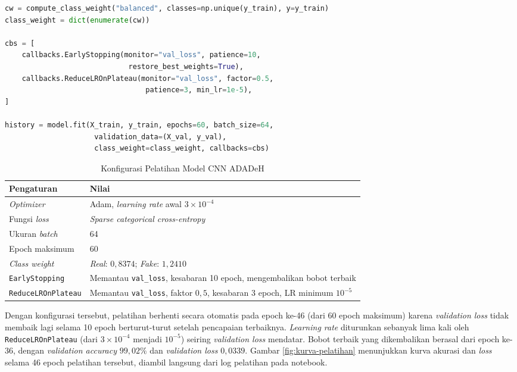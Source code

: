 \begin{lstlisting}[language=Python, caption={Pelatihan model CNN dengan \textit{class weight} dan \textit{callback}}, label={lst:pelatihan}]
cw = compute_class_weight("balanced", classes=np.unique(y_train), y=y_train)
class_weight = dict(enumerate(cw))

cbs = [
    callbacks.EarlyStopping(monitor="val_loss", patience=10,
                             restore_best_weights=True),
    callbacks.ReduceLROnPlateau(monitor="val_loss", factor=0.5,
                                 patience=3, min_lr=1e-5),
]

history = model.fit(X_train, y_train, epochs=60, batch_size=64,
                     validation_data=(X_val, y_val),
                     class_weight=class_weight, callbacks=cbs)
\end{lstlisting}

\begin{table}[htbp]
  \centering
  \caption{Konfigurasi Pelatihan Model CNN ADADeH}
  \label{tab:konfigurasi-pelatihan}
  \begin{tabular}{@{}lp{8.4cm}@{}}
    \toprule
    \textbf{Pengaturan} & \textbf{Nilai} \\
    \midrule
    \textit{Optimizer} & Adam, \textit{learning rate} awal $3\times10^{-4}$ \\
    Fungsi \textit{loss} & \textit{Sparse categorical cross-entropy} \\
    Ukuran \textit{batch} & 64 \\
    Epoch maksimum & 60 \\
    \textit{Class weight} & \textit{Real}: $0{,}8374$; \textit{Fake}: $1{,}2410$ \\
    \texttt{EarlyStopping} & Memantau \texttt{val\_loss}, kesabaran 10 epoch, mengembalikan bobot terbaik \\
    \texttt{ReduceLROnPlateau} & Memantau \texttt{val\_loss}, faktor $0{,}5$, kesabaran 3 epoch, LR minimum $10^{-5}$ \\
    \bottomrule
  \end{tabular}
\end{table}

Dengan konfigurasi tersebut, pelatihan berhenti secara otomatis pada epoch ke-46
(dari 60 epoch maksimum) karena \textit{validation loss} tidak membaik lagi selama
10 epoch berturut-turut setelah pencapaian terbaiknya. \textit{Learning rate}
diturunkan sebanyak lima kali oleh \texttt{ReduceLROnPlateau} (dari $3\times10^{-4}$
menjadi $10^{-5}$) seiring \textit{validation loss} mendatar. Bobot terbaik yang
dikembalikan berasal dari epoch ke-36, dengan \textit{validation accuracy}
$99{,}02\%$ dan \textit{validation loss} $0{,}0339$. Gambar
\ref{fig:kurva-pelatihan} menunjukkan kurva akurasi dan \textit{loss} selama 46
epoch pelatihan tersebut, diambil langsung dari log pelatihan pada notebook.

